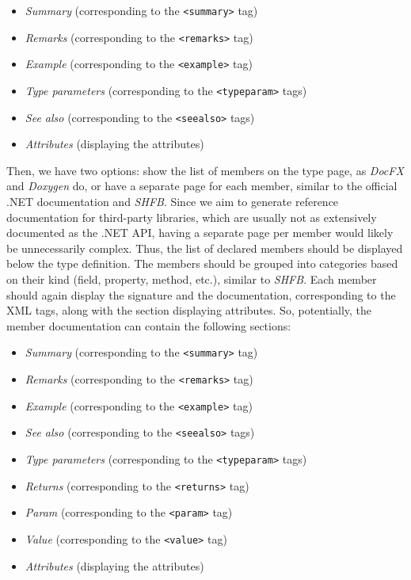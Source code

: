 \begin{itemize}
    \item \textit{Summary} (corresponding to the \texttt{<summary>} tag)
    \item \textit{Remarks} (corresponding to the \texttt{<remarks>} tag)
    \item \textit{Example} (corresponding to the \texttt{<example>} tag)
    \item \textit{Type parameters} (corresponding to the \texttt{<typeparam>} tags)
    \item \textit{See also} (corresponding to the \texttt{<seealso>} tags)
    \item \textit{Attributes} (displaying the attributes)
\end{itemize}

Then, we have two options: show the list of members on the type page, as \textit{DocFX} and \textit{Doxygen} do, or have a separate page for each member, similar to the official .NET documentation and \textit{SHFB}.
Since we aim to generate reference documentation for third-party libraries, which are usually not as extensively documented as the .NET API, 
having a separate page per member would likely be unnecessarily complex.
Thus, the list of declared members should be displayed below the type definition. The members should be grouped into categories based on their kind (field, property, method, etc.), similar to \textit{SHFB}.
Each member should again display the signature and the documentation, corresponding to the XML tags, along with the section displaying attributes.
So, potentially, the member documentation can contain the following sections:

\begin{itemize}
    \item \textit{Summary} (corresponding to the \texttt{<summary>} tag)
    \item \textit{Remarks} (corresponding to the \texttt{<remarks>} tag)
    \item \textit{Example} (corresponding to the \texttt{<example>} tag)
    \item \textit{See also} (corresponding to the \texttt{<seealso>} tags)
    \item \textit{Type parameters} (corresponding to the \texttt{<typeparam>} tags)
    \item \textit{Returns} (corresponding to the \texttt{<returns>} tag)
    \item \textit{Param} (corresponding to the \texttt{<param>} tag)
    \item \textit{Value} (corresponding to the \texttt{<value>} tag)
    \item \textit{Attributes} (displaying the attributes)
\end{itemize}

